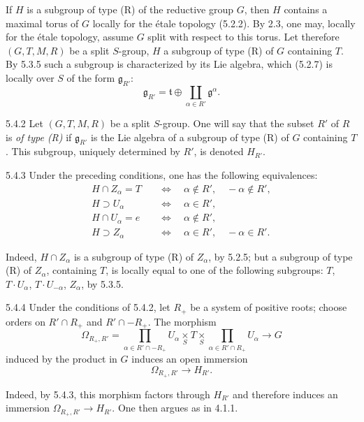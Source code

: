 \label{XXII.5.4.1}
If $H$ is a subgroup of type (R) of the reductive group $G$, then $H$ contains a maximal torus of $G$ locally for the \'etale topology (5.2.2). By 2.3, one may, locally for the \'etale topology, assume $G$ split with respect to this torus. Let therefore $(G,T,M,R)$ be a split $S$-group, $H$ a subgroup of type (R) of $G$ containing $T$. By 5.3.5 such a subgroup is characterized by its Lie algebra, which (5.2.7) is locally over $S$ of the form $\mathfrak g_{R'}$:
\[
\mathfrak g_{R'}=\mathfrak t\oplus\coprod_{\alpha\in R'}\mathfrak g^\alpha.
\]
\begin{definition}{5.4.2}\label{XXII.5.4.2}
Let $(G,T,M,R)$ be a split $S$-group. One will say that the subset $R'$ of $R$ is \emph{of type (R)} if $\mathfrak g_{R'}$ is the Lie algebra of a subgroup of type (R) of $G$ containing $T$. This subgroup, uniquely determined by $R'$, is denoted $H_{R'}$.
\end{definition}
\begin{lemma}{5.4.3}\label{XXII.5.4.3}
Under the preceding conditions, one has the following equivalences:
\[
\begin{aligned}
H\cap Z_\alpha=T&\quad\Longleftrightarrow\quad\alpha\notin R',\quad-\alpha\notin R',\\
H\supset U_\alpha&\quad\Longleftrightarrow\quad\alpha\in R',\\
H\cap U_\alpha=e&\quad\Longleftrightarrow\quad\alpha\notin R',\\
H\supset Z_\alpha&\quad\Longleftrightarrow\quad\alpha\in R',\quad-\alpha\in R'.
\end{aligned}
\]
\end{lemma}
Indeed, $H\cap Z_\alpha$ is a subgroup of type (R) of $Z_\alpha$, by 5.2.5; but a subgroup of type (R) of $Z_\alpha$, containing $T$, is locally equal to one of the following subgroups: $T$, $T\cdot U_\alpha$, $T\cdot U_{-\alpha}$, $Z_\alpha$, by 5.3.5.
\begin{lemma}{5.4.4}\label{XXII.5.4.4}
Under the conditions of 5.4.2, let $R_+$ be a system of positive roots; choose orders on $R'\cap R_+$ and $R'\cap-R_+$. The morphism
\[
\Omega_{R_+,R'}=\prod_{\alpha\in R'\cap-R_+}U_\alpha\underset S\times T\underset S\times\prod_{\alpha\in R'\cap R_+}U_\alpha\to G
\]
induced by the product in $G$ induces an open immersion
\[
\Omega_{R_+,R'}\to H_{R'}.
\]
\end{lemma}
Indeed, by 5.4.3, this morphism factors through $H_{R'}$ and therefore induces an immersion $\Omega_{R_+,R'}\to H_{R'}$. One then argues as in 4.1.1.
